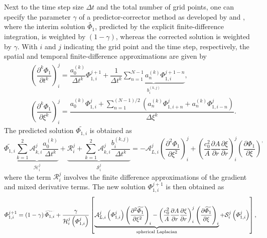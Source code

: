 Next to the time step size $\Delta t$ and the total number of grid points, one can specify the parameter $\gamma$ of a predictor-corrector method as developed by \citet{Dey_and_Dey_1983} and \citet{Nascimento_et_al_2010}, where the interim solution $\widetilde{\Phi_1}$, predicted by the explicit finite-difference integration, is weighted by $\left(1-\gamma\right)$, whereas the corrected solution is weighted by $\gamma$. With $i$ and $j$ indicating the grid point and the time step, respectively, the spatial and temporal finite-difference approximations are given by
\begin{align}
&\left(\dfrac{\partial^k \Phi_1}{\partial t^k}\right)^{j}_{i}
=
\dfrac{a_0^{\left(k\right)}}{\Delta t^k} \Phi^{j+1}_{1,i}
+
\dfrac{1}{\Delta t^k}\underbrace{\sum_{n=1}^{N-1} a_n^{\left(k\right)}\Phi^{j+1-n}_{1,i}
}_{b^{\left(k,j\right)}_i},
\label{eq:fddt_compact} \\
& \left(\dfrac{\partial^k \Phi_1}{\partial \xi^k}\right)^{j}_{i}
=
\dfrac{\displaystyle a_0^{\left(k\right)}\Phi^{j}_{1,i} + \sum_{n=1}^{\left(N-1\right)/2} \left( a_n^{\left(k\right)}\Phi^{j}_{1,i+n} + a_{n}^{\left(k\right)}\Phi^{j}_{1,i-n}\right)}{\Delta\xi^k}.
\label{eq:fddxi_compact}
\end{align}
The predicted solution $\widetilde{\Phi_{1,i}}$ is obtained as
\begin{equation}
\widetilde{\Phi_{1,i}}\underbrace{\sum_{k=1}^2\mathcal{A}_{k,i}^j \dfrac{a_0^{\left(k\right)}}{\Delta t^k}}_{\mathcal{H}^j_i}
+
\underbrace{\mathcal{R}^j_i
+
\sum_{k=1}^2\mathcal{A}_{k,i}^j \dfrac{b^{\left(k,j\right)}_i}{\Delta t^k}}_{\mathcal{S}^j_i}
=
- \mathcal{A}^j_{L,i}\left(\dfrac{\partial^2 \Phi_1}{\partial \xi^2}\right)^j_i + \left(\dfrac{c_0^2}{A}\dfrac{\partial A}{\partial r} \dfrac{\partial \xi}{\partial r}\right)^j_i\left(\dfrac{\partial \Phi_1}{\partial \xi}\right)^,
\label{eq:discreteEqn}
\end{equation}
where the term $\mathcal{R}_i^j$ involves the finite difference approximations of the gradient and mixed derivative terms. The new solution $\Phi^{j+1}_{1,i}$ is then obtained as
\begin{equation}
\Phi^{j+1}_{1,i} = \left(1-\gamma\right)\widetilde{\Phi_{1,i}} + \dfrac{\gamma}{\mathcal{H}^j_i\left(\Phi_{1,i}^{j}\right)}\left[\underbrace{\mathcal{A}^j_{L,i}\left(\Phi_{1,i}^{j}\right)\left(\dfrac{\partial^2\widetilde{\Phi_1}}{\partial \xi^2}\right)_i - \left(\dfrac{c_0^2}{A}\dfrac{\partial A}{\partial r} \dfrac{\partial \xi}{\partial r}\right)^j_i\left(\dfrac{\partial \widetilde{\Phi_1}}{\partial \xi}\right)_i}_{\textnormal{spherical Laplacian}} + \mathcal{S}^j_i\left(\Phi_{1,i}^{j}\right)\right],
\label{eq:corrector}
\end{equation}
